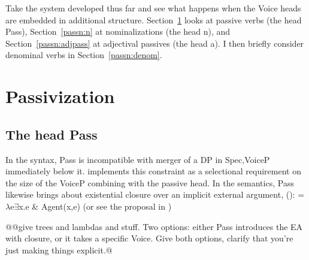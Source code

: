 \label{chap:passn}

Take the system developed thus far and see what happens when the Voice heads are embedded in additional structure. Section~\ref{passn:pass} looks at passive verbs (the head Pass), Section~\ref{passn:n} at nominalizations (the head n), and Section~\ref{passn:adjpass} at adjectival passives (the head a). I then briefly consider denominal verbs in Section~\ref{passn:denom}.

\section{Passivization} \label{passn:pass}
	\subsection{The head Pass}
In the syntax, Pass is incompatible with merger of a DP in Spec,VoiceP immediately below it. \cite{bruening13} implements this constraint as a selectional requirement on the size of the VoiceP combining with the passive head. In the semantics, Pass likewise brings about existential closure over an implicit external argument, (\nextx):
\ex {} = $\lambda$e$\exists$x.e \& Agent(x,e) \hfill (or see the proposal in \citealt{bruening13})
\xe

@@give trees and lambdas and stuff. Two options: either Pass introduces the EA with closure, or it takes a specific Voice. Give both options, clarify that you're just making things explicit.@
	
	
